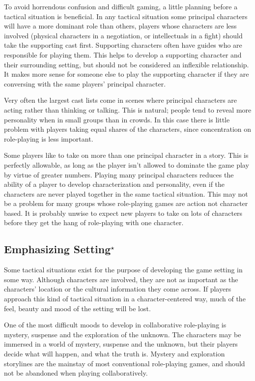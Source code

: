 \documentclass[twoside]{book}
\begin{document}
To avoid horrendous confusion and difficult gaming, a little planning
before a tactical situation is beneficial. In any tactical situation
some principal characters will have a more dominant role than others,
players whose characters are less involved (physical characters in a
negotiation, or intellectuals in a fight) should take the supporting
cast first. Supporting characters often have guides who are
responsible for playing them. This helps to develop a supporting
character and their surrounding setting, but should not be considered
an inflexible relationship. It makes more sense for someone else to
play the supporting character if they are conversing with the same
players' principal character.

Very often the largest cast lists come in scenes where principal
characters are acting rather than thinking or talking. This is
natural; people tend to reveal more personality when in small groups
than in crowds. In this case there is little problem with players
taking equal shares of the characters, since concentration on
role-playing is less important.

Some players like to take on more than one principal character in a
story. This is perfectly allowable, as long as the player isn't
allowed to dominate the game play by virtue of greater
numbers. Playing many principal characters reduces the ability of a
player to develop characterization and personality, even if the
characters are never played together in the same tactical
situation. This may not be a problem for many groups whose
role-playing games are action not character based. It is probably
unwise to expect new players to take on lots of characters before they
get the hang of role-playing with one character.

\subsection{Emphasizing Setting$^\star$} %

Some tactical situations exist for the purpose of developing the game
setting in some way. Although characters are involved, they are not as
important as the characters' location or the cultural information they
come across. If players approach this kind of tactical situation in a
character-centered way, much of the feel, beauty and mood of the
setting will be lost.

One of the most difficult moods to develop in collaborative
role-playing is mystery, suspense and the exploration of the
unknown. The characters may be immersed in a world of mystery,
suspense and the unknown, but their players decide what will happen,
and what the truth is. Mystery and exploration storylines are the
mainstay of most conventional role-playing games, and should not be
abandoned when playing collaboratively.
\end{document}
